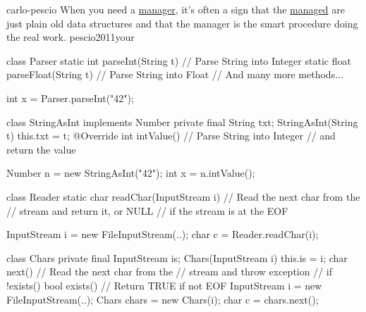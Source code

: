 \documentclass{article}
\begin{document}

\pptToc

\qte
  {carlo-pescio}
  {When you need a \ul{manager}, it’s often a sign that the \ul{managed} are just plain old data structures and that the manager is the smart procedure doing the real work.}
  {pescio2011your}


\begin{pptWide}{2}
{\small\begin{ffcode}
class Parser {
  static int parseInt(String t) {
    // Parse String into Integer
  }
  static float parseFloat(String t) {
    // Parse String into Float
  }
  // And many more methods...
}

int x = Parser.parseInt("42");
\end{ffcode}
}
\par\columnbreak\par
{\small\begin{ffcode}
class StringAsInt implements Number {
  private final String txt;
  StringAsInt(String t) { this.txt = t; }
  @Override int intValue() {
    // Parse String into Integer
    // and return the value
  }
}

Number n = new StringAsInt("42");
int x = n.intValue();
\end{ffcode}
}
\end{pptWide}
\plush{}

\begin{pptWide}{2}
{\small\begin{ffcode}
class Reader {
  static char readChar(InputStream i) {
    // Read the next char from the
    // stream and return it, or NULL
    // if the stream is at the EOF
  }
}

InputStream i = new FileInputStream(..);
char c = Reader.readChar(i);
\end{ffcode}
}
\par\columnbreak\par
{\small\begin{ffcode}
class Chars
  private final InputStream is;
  Chars(InputStream i)
    this.is = i;
  char next()
    // Read the next char from the
    // stream and throw exception
    // if !exists()
  bool exists()
    // Return TRUE if not EOF
InputStream i = new FileInputStream(..);
Chars chars = new Chars(i);
char c = chars.next();
\end{ffcode}
}
\end{pptWide}
\plush{}
\end{document}
